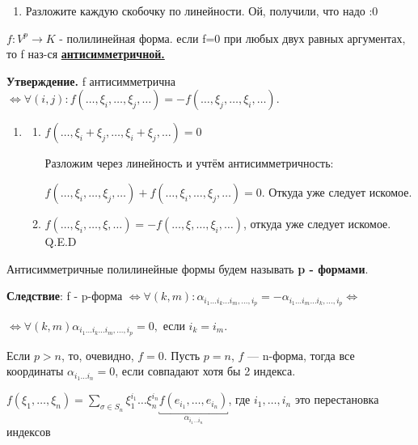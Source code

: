 \begin{enumerate}
    \item[] \prooff{}
          Разложите каждую скобочку по линейности. Ой, получили, что надо :0
\end{enumerate}



\(f: V^p \rightarrow K\) - полилинейная форма. если f=0 при любых двух равных аргументах, то f наз-ся \uline{\textbf{антисимметричной.}}

\textbf{Утверждение.} f антисимметрична \(\Leftrightarrow \forall(i,j): f(\ldots,\xi_i,\ldots, \xi_j,\ldots) =- f(\ldots,\xi_j,\ldots, \xi_i,\ldots) \).

\begin{enumerate}
    \item[] \prooff{}
        \begin{enumerate}
            \item[] \fbox{${\Rightarrow}$}
            
          \(f(\ldots, \xi_i + \xi_j,\ldots, \xi_i + \xi_j,\ldots) = 0\)

          Разложим через линейность и учтём антисимметричность:

          \(f(\ldots, \xi_i,\ldots,  \xi_j,\ldots)  + f(\ldots, \xi_i,\ldots,  \xi_j,\ldots)  = 0\). Откуда уже следует искомое.

          
            \item[] \fbox{${\Leftarrow}$}
            
            \(f(\ldots, \xi_i ,\ldots, \xi,\ldots) = - f(\ldots, \xi ,\ldots, \xi_i,\ldots)\), откуда уже следует искомое.  Q.E.D
          
        \end{enumerate}
\end{enumerate}

Антисимметричные полилинейные формы будем называть \textbf{p - формами}.

\textbf{Следствие}: f - p-форма \(\Leftrightarrow \forall  (k,m): \alpha_{i_1 \ldots i_k \ldots i_m, \ldots, i_p} = - \alpha_{i_1 \ldots i_m \ldots i_k, \ldots, i_p} \Leftrightarrow\)

\(\Leftrightarrow \forall (k,m) \alpha_{i_1 \ldots i_k \ldots i_m, \ldots, i_p}=0,\) если \(i_k = i_m\).


Если $p > n$, то, очевидно, $f = 0$. Пусть $p=n$, $f$ --- n-форма, тогда все координаты $\alpha_{i_1 \dots i_n} = 0$, если совпадают хотя бы 2 индекса. 

\(f(\xi_1,\ldots,\xi_n) =  \sum\limits_{\sigma \in S_n} \xi_1^{i_1} \ldots \xi_n^{i_n} \underbracket{f(e_{i_1},\ldots,e_{i_n})}_{\alpha_{i_1 \dots i_n}}\), где $i_1,\ldots,i_n$ это перестановка индексов

